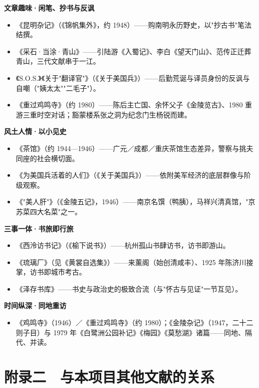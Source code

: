 \documentclass[UTF8,fontset=none,zihao=-4,a4paper]{ctexart}
\begin{document}
\textbf{文章趣味·闲笔、抄书与反讽}

\begin{itemize}
\item 《昆明杂记》（《锦帆集外》，约 1948）——购南明永历野史，以"抄古书"笔法结撰。
\item 《采石·当涂·青山》——引陆游《入蜀记》、李白《望天门山》、范传正迁葬青山，三代文献串于一江。
\item 《S.O.S.》《关于"翻译官"》（《关于美国兵》）——后勤荒诞与译员身份的反讽与自嘲（"姨太太""二毛子"）。
\item 《重过鸡鸣寺》（约 1980）——陈后主亡国、余怀父子《金陵览古》、1980 重游三重时空对话；豁蒙楼系张之洞为纪念门生杨锐而建。
\end{itemize}


\textbf{风土人情·以小见史}

\begin{itemize}
\item 《茶馆》（约 1944—1946）——广元／成都／重庆茶馆生态差异，警察与挑夫同座的社会横切面。
\item 《为美国兵活着的人们》（《关于美国兵》）——依附美军经济的底层群像与阶级观察。
\item 《"美人肝"》（《金陵五记》，1946）——南京名馔（鸭胰），马祥兴清真馆，"京苏菜四大名菜"之一。
\end{itemize}


\textbf{三事一体·书旅即行旅}

\begin{itemize}
\item 《西泠访书记》（《榆下说书》）——杭州孤山书肆访书，访书即游山。
\item 《琉璃厂》（见《黄裳自选集》）——来薰阁（始创清咸丰）、1925 年陈济川接掌，访书即城市考古。
\item 《泽存书库》——书史与政治史的极致合流（与"怀古与见证"一节互见）。
\end{itemize}


\textbf{时间纵深·同地重访}

\begin{itemize}
\item 《鸡鸣寺》（1946）／《重过鸡鸣寺》（约 1980）；《金陵杂记》（1947，二十二则子目）与 1979 年《白鹭洲公园补记》《梅园》《莫愁湖》诸篇——同地、隔代、并读。
\end{itemize}


\section{附录二　与本项目其他文献的关系}
\end{document}

